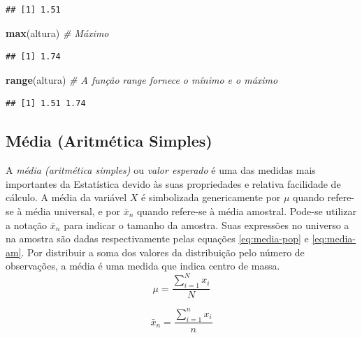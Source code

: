 \documentclass[
]{book}
\newenvironment{Shaded}{\begin{snugshade}}{\end{snugshade}}
\newcommand{\CommentTok}[1]{\textcolor[rgb]{0.56,0.35,0.01}{\textit{#1}}}
\newcommand{\KeywordTok}[1]{\textcolor[rgb]{0.13,0.29,0.53}{\textbf{#1}}}
\newcommand{\NormalTok}[1]{#1}
\theoremstyle{definition}
\theoremstyle{definition}
\theoremstyle{definition}
\theoremstyle{remark}
\begin{document}
\begin{verbatim}
## [1] 1.51
\end{verbatim}

\begin{Shaded}
\begin{Highlighting}[]
\KeywordTok{max}\NormalTok{(altura)     }\CommentTok{\# Máximo}
\end{Highlighting}
\end{Shaded}

\begin{verbatim}
## [1] 1.74
\end{verbatim}

\begin{Shaded}
\begin{Highlighting}[]
\KeywordTok{range}\NormalTok{(altura)   }\CommentTok{\# A função \textquotesingle{}range\textquotesingle{} fornece o mínimo e o máximo}
\end{Highlighting}
\end{Shaded}

\begin{verbatim}
## [1] 1.51 1.74
\end{verbatim}

\hypertarget{mas}{%
\subsection{Média (Aritmética Simples)}\label{mas}}

A \emph{média (aritmética simples)} ou \emph{valor esperado} é uma das medidas mais importantes da Estatística devido às suas propriedades e relativa facilidade de cálculo. A média da variável \(X\) é simbolizada genericamente por \(\mu\) quando refere-se à média universal, e por \(\bar{x}_{n}\) quando refere-se à média amostral. Pode-se utilizar a notação \(\bar{x}_{n}\) para indicar o tamanho da amostra. Suas expressões no universo a na amostra são dadas respectivamente pelas equações \eqref{eq:media-pop} e \eqref{eq:media-am}. Por distribuir a soma dos valores da distribuição pelo número de observações, a média é uma medida que indica centro de massa.
\begin{equation}
\mu = \frac {\sum_{i=1}^N x_i}{N}
\label{eq:media-pop}
\end{equation}

\begin{equation}
\bar{x}_{n} = \frac {\sum_{i=1}^n x_i}{n}
\label{eq:media-am}
\end{equation}
\end{document}
